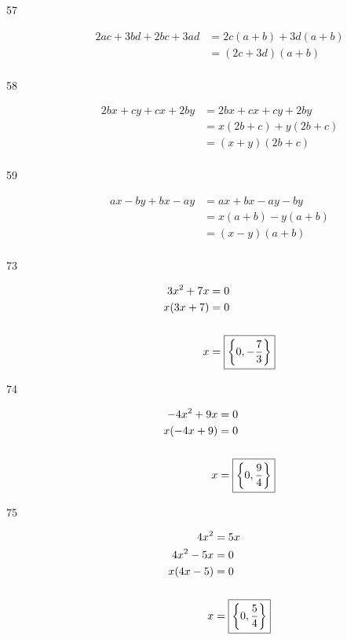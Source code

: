 \documentclass[letterpaper]{exam}
\begin{document}
\begin{description}
      \item[57]
      \begin{align*}
         2ac + 3bd + 2bc + 3ad & = 2c(a + b) + 3d(a + b) \\
                               & = \boxed{ (2c + 3d)(a + b) } \\
      \end{align*}

      \item[58]
      \begin{align*}
        2bx + cy + cx + 2by & = 2bx + cx + cy + 2by \\
                            & = x(2b + c) + y(2b + c) \\
                            & = \boxed{ (x + y)(2b + c) } \\
      \end{align*}

      \item[59]
        \begin{align*}
          ax - by + bx - ay & = ax + bx -ay - by \\
                            & = x(a + b) - y(a + b) \\
                            & = \boxed{ (x - y)(a + b) } \\
        \end{align*}

      \item[73]
        \begin{align*}
          3x^2 + 7x & = 0 \\
          x(3x + 7) & = 0 \\
          \\
          x         & = \boxed{ \cbr{ 0, - \frac{7}{3} } } \\
        \end{align*}

      \item[74]
        \begin{align*}
          -4x^2 + 9x & = 0 \\
          x(-4x + 9) & = 0 \\
          \\
          x          & = \boxed{ \cbr{ 0, \frac{9}{4} } } \\
        \end{align*}

      \item[75]
        \begin{align*}
          4x^2      & = 5x \\
          4x^2 - 5x & = 0 \\
          x(4x - 5) & = 0 \\
          \\
          x         & = \boxed{ \cbr{ 0, \frac{5}{4} } } \\
        \end{align*}


\end{description}
\end{document}
